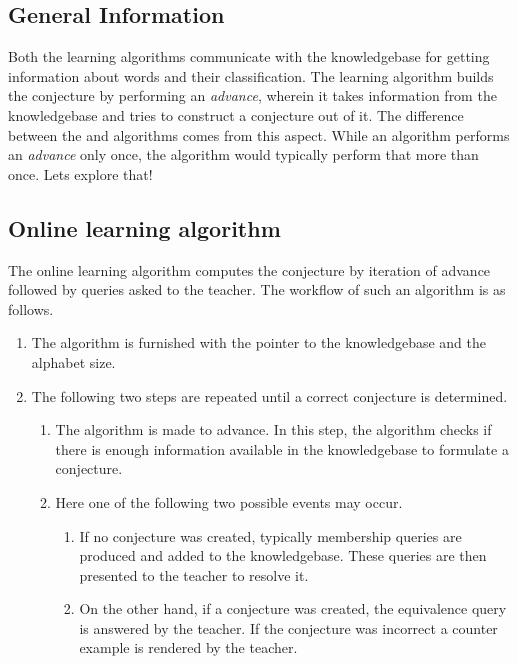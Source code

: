 \subsection{General Information}
Both the learning algorithms communicate with the knowledgebase for getting information about words and their classification. The learning algorithm builds the conjecture by performing an \emph{advance}, wherein it takes information from the knowledgebase and tries to construct a conjecture out of it. The difference between the \online and \offline algorithms comes from this aspect. While an \offline algorithm performs an \emph{advance} only once, the \online algorithm would typically perform that more than once. Lets explore that!

\subsection{Online learning algorithm}
The online learning algorithm computes the conjecture by iteration of advance followed by queries asked to the teacher. The workflow of such an algorithm is as follows. \\

\begin{enumerate}
 \item The algorithm is furnished with the pointer to the knowledgebase and the alphabet size.
 \item The following two steps are repeated until a correct conjecture is determined.
	\begin{enumerate}
	    \item The algorithm is made to advance. In this step, the algorithm checks if there is enough information available in the knowledgebase to formulate a conjecture.
	    \item Here one of the following two possible events may occur.
	    \begin{enumerate}
	    \item If no conjecture was created, typically membership queries are produced and added to the knowledgebase. These queries are then presented to the teacher to resolve it.
	    \item On the other hand, if a conjecture was created, the equivalence query is answered by the teacher. If the conjecture was incorrect a counter example is rendered by the teacher.
	    \end{enumerate}
	\end{enumerate}
\end{enumerate}
